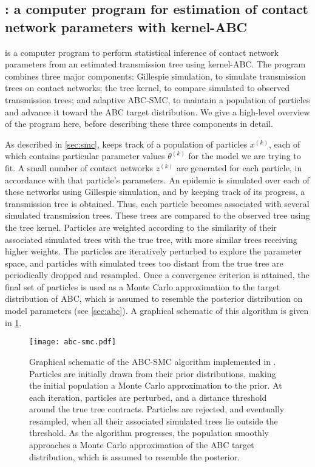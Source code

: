 \subsection{: a computer program for estimation of contact
network parameters with kernel-ABC}

 is a computer program to perform statistical inference of
contact network parameters from an estimated transmission tree using
kernel-\gls{ABC}. The program combines three major components: Gillespie
simulation, to simulate transmission trees on contact networks; the tree
kernel, to compare simulated to observed transmission trees; and adaptive
\gls{ABC}-\gls{SMC}, to maintain a population of particles and advance it
toward the \gls{ABC} target distribution. We give a high-level overview of the
program here, before describing these three components in detail.

As described in \cref{sec:smc},  keeps track of a population
of particles $x^{(k)}$, each of which contains particular parameter values
$\theta^{(k)}$ for the model we are trying to fit. A small number of contact
networks $z^{(k)}$ are generated for each particle, in accordance with that
particle's parameters. An epidemic is simulated over each of these networks
using Gillespie simulation, and by keeping track of its progress, a
transmission tree is obtained. Thus, each particle becomes associated with
several simulated transmission trees. These trees are compared to the observed
tree using the tree kernel. Particles are weighted according to the similarity
of their associated simulated trees with the true tree, with more similar trees
receiving higher weights. The particles are iteratively perturbed to explore
the parameter space, and particles with simulated trees too distant from the
true tree are periodically dropped and resampled. Once a convergence criterion
is attained, the final set of particles is used as a Monte Carlo approximation
to the target distribution of \gls{ABC}, which is assumed to resemble the
posterior distribution on model parameters (see \cref{sec:abc}). A graphical
schematic of this algorithm is given in \cref{fig:abcsmc}.

\begin{figure}
    \texttt{[image: abc-smc.pdf]}
    \caption[Graphical schematic of the ABC-SMC algorithm implemented in .]{
      Graphical schematic of the \gls{ABC}-\gls{SMC} algorithm implemented in
      . Particles are initially drawn from their prior
      distributions, making the initial population a Monte Carlo approximation
      to the prior. At each iteration, particles are perturbed, and a distance
      threshold around the true tree contracts. Particles are rejected, and
      eventually resampled, when all their associated simulated trees lie
      outside the threshold. As the algorithm progresses, the population
      smoothly approaches a Monte Carlo approximation of the \gls{ABC} target
      distribution, which is assumed to resemble the posterior.
    }
    \label{fig:abcsmc}
\end{figure}

